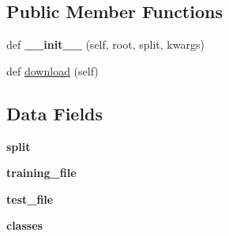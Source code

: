 \subsection*{Public Member Functions}
\begin{DoxyCompactItemize}
\item 
\mbox{\label{classtorchvision_1_1datasets_1_1mnist_1_1EMNIST_a7ebf2f0e900e6bfdf32d83e5dbd44c2f}} 
def {\bfseries \+\_\+\+\_\+init\+\_\+\+\_\+} (self, root, split, kwargs)
\item 
def \hyperlink{classtorchvision_1_1datasets_1_1mnist_1_1EMNIST_a310e4e3b50dff00290065d416060248c}{download} (self)
\end{DoxyCompactItemize}
\subsection*{Data Fields}
\begin{DoxyCompactItemize}
\item 
\mbox{\label{classtorchvision_1_1datasets_1_1mnist_1_1EMNIST_a1b2674c6d33e90c7f2f9f3ba7f6e1636}} 
{\bfseries split}
\item 
\mbox{\label{classtorchvision_1_1datasets_1_1mnist_1_1EMNIST_a85401b164c3e5a48c722f73d0bb10abb}} 
{\bfseries training\+\_\+file}
\item 
\mbox{\label{classtorchvision_1_1datasets_1_1mnist_1_1EMNIST_a79643b73b88da967f0968e0df9872d48}} 
{\bfseries test\+\_\+file}
\item 
\mbox{\label{classtorchvision_1_1datasets_1_1mnist_1_1EMNIST_adffa8e72263c38474aad77cf9d33e454}} 
{\bfseries classes}
\end{DoxyCompactItemize}
